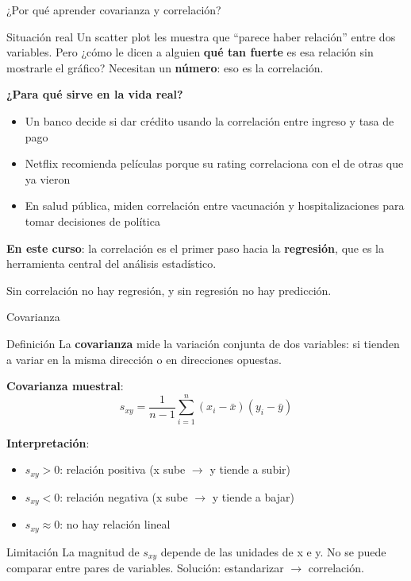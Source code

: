 \documentclass[aspectratio=169, 11pt]{beamer}
\begin{document}
\begin{frame}{¿Por qué aprender covarianza y correlación?}
\begin{exampleblock}{Situación real}
Un scatter plot les muestra que ``parece haber relaci\'on'' entre dos variables.
Pero ¿c\'omo le dicen a alguien \textbf{qu\'e tan fuerte} es esa relaci\'on sin mostrarle el gr\'afico?
Necesitan un \textbf{n\'umero}: eso es la correlaci\'on.
\end{exampleblock}

\textbf{¿Para qu\'e sirve en la vida real?}
\begin{itemize}
\item Un banco decide si dar cr\'edito usando la correlaci\'on entre ingreso y tasa de pago
\item Netflix recomienda pel\'iculas porque su rating correlaciona con el de otras que ya vieron
\item En salud p\'ublica, miden correlaci\'on entre vacunaci\'on y hospitalizaciones para tomar decisiones de pol\'itica
\end{itemize}

\vspace{0.3em}
\textbf{En este curso}: la correlaci\'on es el primer paso hacia la \textbf{regresi\'on}, que es la herramienta central del an\'alisis estad\'istico.

\vspace{0.3em}
\alert{Sin correlaci\'on no hay regresi\'on, y sin regresi\'on no hay predicci\'on.}
\end{frame}

\begin{frame}{Covarianza}
\small
\begin{block}{Definición}
La \textbf{covarianza} mide la variación conjunta de dos variables: si tienden a variar en la misma dirección o en direcciones opuestas.
\end{block}

\textbf{Covarianza muestral}:
\[
s_{xy} = \frac{1}{n-1} \sum_{i=1}^n (x_i - \bar{x})(y_i - \bar{y})
\]

\textbf{Interpretación}:
\begin{itemize}\setlength{\itemsep}{1pt}
\item $s_{xy} > 0$: relación positiva (x sube $\to$ y tiende a subir)
\item $s_{xy} < 0$: relación negativa (x sube $\to$ y tiende a bajar)
\item $s_{xy} \approx 0$: no hay relaci\'on lineal
\end{itemize}

\begin{alertblock}{Limitaci\'on}
La magnitud de $s_{xy}$ depende de las unidades de x e y. No se puede comparar entre pares de variables. \alert{Solución: estandarizar $\to$ correlación}.
\end{alertblock}
\end{frame}
\end{document}
